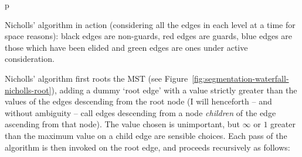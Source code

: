 \begin{stusubfig}{p}
	\hspace{4mm}%
	\hspace{4mm}%
\caption[Nicholls' algorithm in action]{Nicholls' algorithm in action (considering all the edges in each level at a time for space reasons): black edges are non-guards, red edges are guards, blue edges are those which have been elided and green edges are ones under active consideration.}
\label{fig:segmentation-waterfall-nicholls-example}
\end{stusubfig}

Nicholls' algorithm first roots the MST (see Figure~\ref{fig:segmentation-waterfall-nicholls-root}), adding a dummy `root edge' with a value strictly greater than the values of the edges descending from the root node (I will henceforth -- and without ambiguity -- call edges descending from a node \emph{children} of the edge ascending from that node). The value chosen is unimportant, but $\infty$ or $1$ greater than the maximum value on a child edge are sensible choices. Each pass of the algorithm is then invoked on the root edge, and proceeds recursively as follows:


